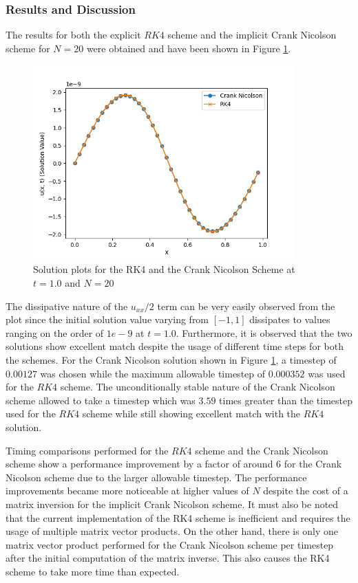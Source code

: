 \documentclass[12pt]{article}
\begin{document}
\subsubsection{Results and Discussion}
The results for both the explicit $RK4$ scheme and the implicit Crank Nicolson scheme for $N = 20$ were obtained and have been shown in Figure \ref{fig:q1solutioncomp}.
\begin{figure}
    \centering
    \includegraphics[width=10cm]{Q1SolutionComparisont=0.001.png}
    \caption{Solution plots for the RK4 and the Crank Nicolson Scheme at $t = 1.0$ and $N = 20$}
    \label{fig:q1solutioncomp}
\end{figure}
The dissipative nature of the $u_{xx}/2$ term can be very easily observed from the plot since the initial solution value varying from $[-1, 1]$ dissipates to values ranging on the order of $1e-9$ at $t=1.0$. Furthermore, it is observed that the two solutions show excellent match despite the usage of different time steps for both the schemes. For the Crank Nicolson solution shown in Figure \ref{fig:q1solutioncomp}, a timestep of $0.00127$ was chosen while the maximum allowable timestep of $0.000352$ was used for the $RK4$ scheme. The unconditionally stable nature of the Crank Nicolson scheme allowed to take a timestep which was $3.59$ times greater than the timestep used for the $RK4$ scheme while still showing excellent match with the $RK4$ solution. 

Timing comparisons performed for the $RK4$ scheme and the Crank Nicolson scheme show a performance improvement by a factor of around $6$ for the Crank Nicolson scheme due to the larger allowable timestep. The performance improvements became more noticeable at higher values of $N$ despite the cost of a matrix inversion for the implicit Crank Nicolson scheme. It must also be noted that the current implementation of the RK4 scheme is inefficient and requires the usage of multiple matrix vector products. On the other hand, there is only one matrix vector product performed for the Crank Nicolson scheme per timestep after the initial computation of the matrix inverse. This also causes the RK4 scheme to take more time than expected. 
\end{document}
